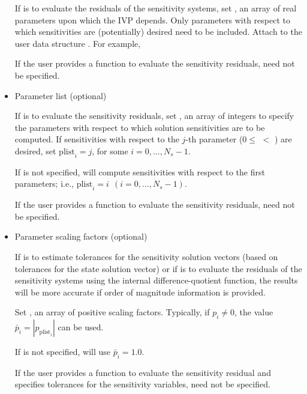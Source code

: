 \begin{Steps}
\begin{itemize}
      If {\idas} is to evaluate the residuals of the sensitivity 
      systems, set , an array of  real parameters upon which the IVP 
      depends. Only parameters with respect to which sensitivities are (potentially) 
      desired need to be included. 
      Attach  to the user data structure . 
      For example, 

      If the user provides a function to evaluate the sensitivity residuals,
       need not be specified.

    \item Parameter list (optional)

      If {\idas} is to evaluate the sensitivity residuals,
      set , an array of  integers to specify the 
      parameters  with respect to which solution sensitivities are to be computed.
      If sensitivities with respect to the $j$-th parameter 
      ($0 \leq $  $<$ ) are desired, set
      ${\text{plist}}_i = j$, for some $i=0,\ldots, N_s-1$.

      If  is not specified, {\idas} will compute sensitivities with respect
      to the first  parameters; i.e., ${\text{plist}}_i = i ~~ (i=0,\ldots,N_s-1)$.

      If the user provides a function to evaluate the sensitivity residuals,
       need not be specified.

    \item Parameter scaling factors (optional)

      If {\idas} is to estimate tolerances for the sensitivity solution vectors (based
      on tolerances for the state solution vector) or if {\idas} is to evaluate 
      the residuals of the sensitivity systems using the internal difference-quotient
      function, the results will be more accurate if order of magnitude information is provided.

      Set , an array of  positive scaling factors. Typically,
      if $p_i \ne 0$, the value ${\bar p}_i = |p_{\text{plist}_i}|$ can be used.

      If  is not specified, {\idas} will use ${\bar p}_i = 1.0$.

      If the user provides a function to evaluate the sensitivity residual and specifies
      tolerances for the sensitivity variables,  need not be specified.

    \end{itemize}


\end{Steps}
